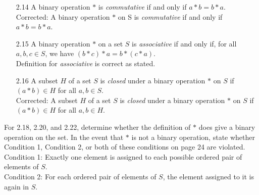 \documentclass[12pt]{article}
\begin{document}
\begin{enumerate}
\begin{enumerate}
			\item[2.14] A binary operation $*$ is \textit{commutative} if and only if $a*b = b*a$.\\
			Corrected:  A binary operation $*$ on S is \textit{commutative} if and only if $a*b = b*a$.
			
				
			\item[2.15] A binary operation $*$ on a set $S$ is \textit{associative} if and only if, for all $a,b,c\in S$, we have $(b*c)*a = b*(c*a)$.\\
			Definition for \textit{associative} is correct as stated.
			
			\item[2.16] A subset $H$ of a set $S$ is \textit{closed} under a binary operation $*$ on $S$ if $(a*b) \in H$ for all $a,b \in S$.\\
			Corrected: A subset $H$ of a set $S$ is \textit{closed} under a binary operation $*$ on $S$ if $(a*b) \in H$ for all $a,b \in H$.
			
		\end{enumerate}
		
		For 2.18, 2.20, and 2.22, determine whether the definition of $*$ does give a binary operation on the set. In the event that $*$ is not a binary operation, state whether Condition 1, Condition 2, or both of these conditions on page 24 are violated.\\
		
		Condition 1: Exactly one element is assigned to each possible ordered pair of elements of $S$.\\
		Condition 2: For each ordered pair of elements of $S$, the element assigned to it is again in $S$.
		
		\begin{enumerate}
			

\end{enumerate}
\end{enumerate}
\end{document}
